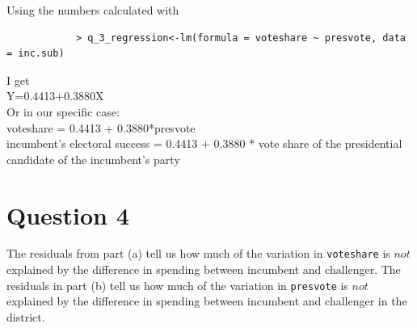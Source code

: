\documentclass[12pt,letterpaper]{article}
\begin{document}
\begin{enumerate}
		Using the numbers calculated with
		\begin{verbatim}
			> q_3_regression<-lm(formula = voteshare ~ presvote, data = inc.sub)
		\end{verbatim}
		I get \\
		Y=0.4413+0.3880X \\
		Or in our specific case: \\
		voteshare = 0.4413 + 0.3880*presvote \\
		incumbent's electoral success = 0.4413 + 0.3880 * vote share of the presidential candidate of the incumbent's party
	
	\end{enumerate}
	

\newpage	
\section*{Question 4}
\noindent The residuals from part (a) tell us how much of the variation in \texttt{voteshare} is $not$ explained by the difference in spending between incumbent and challenger. The residuals in part (b) tell us how much of the variation in \texttt{presvote} is $not$ explained by the difference in spending between incumbent and challenger in the district.
\end{document}
